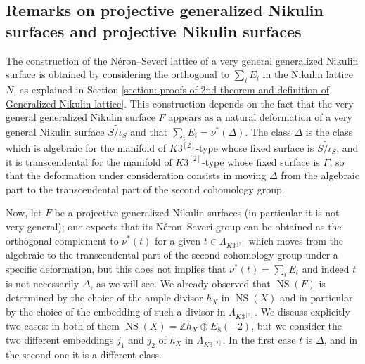 \documentclass{amsart}
\theoremstyle{definition}
\numberwithin{equation}{section}
\numberwithin{equation}{section} \theoremstyle{definition}
\DeclareMathOperator{\NS}{NS}
\newcommand\Z{\mathbb{Z}}
\begin{document}
\subsection{Remarks on projective generalized Nikulin surfaces and projective Nikulin surfaces}
The construction of the N\'eron--Severi lattice of a very general generalized Nikulin surface is obtained by considering the orthogonal to $\sum_iE_i$ in the Nikulin lattice $N$, as explained in Section \ref{section: proofs of 2nd theorem and definition of Generalized Nikulin lattice}. This construction depends on the fact that the very general generalized Nikulin surface $F$ appears as a natural deformation of a very general Nikulin surface $\widetilde{S/\iota_S}$ and that  $\sum_iE_i=\nu^*(\Delta)$. The class $\Delta$ is the class which is algebraic for the  manifold of $K3^{[2]}$-type whose fixed surface is $\widetilde{S/\iota_S}$, and it is transcendental for the  manifold of $K3^{[2]}$-type whose fixed surface is $F$, so that the deformation under consideration consists in moving $\Delta$ from the algebraic part to the transcendental part of the second cohomology group.

Now, let $F$ be a projective generalized Nikulin surfaces (in particular it is not very general); one expects that its N\'eron--Severi group can be obtained as the orthogonal complement to $\nu^*(t)$ for a given $t\in \Lambda_{K3^{[2]}}$ which moves from the algebraic to the transcendental part of the second cohomology group under a specific deformation, but this does not implies that $\nu^*(t)=\sum_iE_i$ and indeed $t$ is not necessarily $\Delta$, as we will see. We already observed that $\NS(F)$ is determined by the choice of the ample divisor $h_X$ in $\NS(X)$ and in particular by the choice of the embedding of such a divisor in $\Lambda_{K3^{[2]}}$. We discuss explicitly two cases: in both of them $\NS(X)=\Z h_X\oplus E_8(-2)$, but we consider the two different embeddings $j_1$ and $j_2$ of $h_X$ in $\Lambda_{K3^{[2]}}$. In the first case $t$ is $\Delta$, and in the second one it is a different class. 
\end{document}
